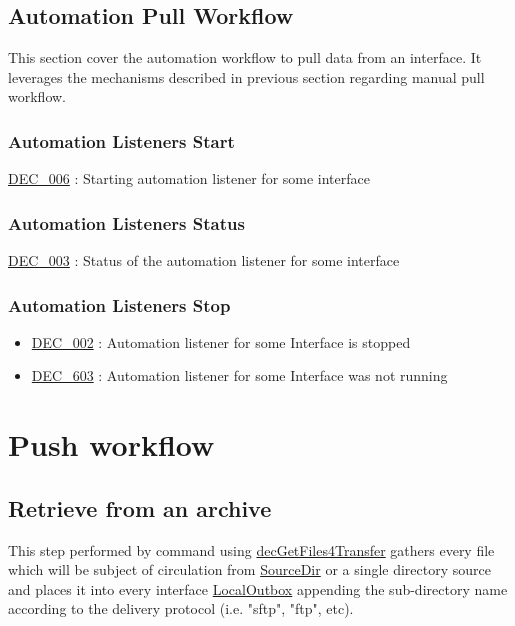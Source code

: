 \documentclass[dec_sum_main.tex]{subfiles}
\begin{document}
\subsection{Automation Pull Workflow}
This section cover the automation workflow to pull data from an interface. It leverages the mechanisms described in previous section regarding manual pull workflow.

\subsubsection{Automation Listeners Start}
 \newline
\noindent

\hyperref[DEC006]{DEC\_006} : Starting automation listener for some interface

\subsubsection{Automation Listeners Status}
 \newline

\hyperref[DEC003]{DEC\_003} : Status of the automation listener for some interface


\subsubsection{Automation Listeners Stop}

\begin{itemize}
    \item \hyperref[DEC002]{DEC\_002} : Automation listener for some Interface is stopped
    \item \hyperref[DEC603]{DEC\_603} : Automation listener for some Interface was not running
\end{itemize}

\section{Push workflow}

\subsection{Retrieve from an archive}
This step performed by command using \hyperref[decGetFiles4Transfer]{decGetFiles4Transfer} gathers every file which will be subject of circulation from \hyperref[SourceDir]{SourceDir} or a single directory source and places it into every interface \hyperref[LocalOutbox]{LocalOutbox} appending the sub-directory name according to the delivery protocol (i.e. "sftp", "ftp", etc).
\end{document}
